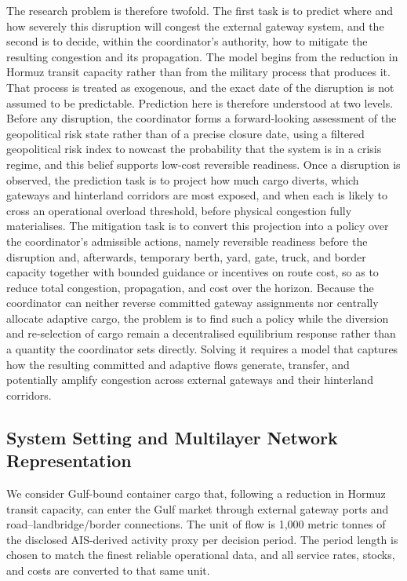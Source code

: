 \documentclass[a4paper,fleqn]{cas-sc}
\begin{document}
The research problem is therefore twofold. The first task is to predict where and how severely this disruption will congest the external gateway system, and the second is to decide, within the coordinator's authority, how to mitigate the resulting congestion and its propagation. The model begins from the reduction in Hormuz transit capacity rather than from the military process that produces it. That process is treated as exogenous, and the exact date of the disruption is not assumed to be predictable. Prediction here is therefore understood at two levels. Before any disruption, the coordinator forms a forward-looking assessment of the geopolitical risk state rather than of a precise closure date, using a filtered geopolitical risk index to nowcast the probability that the system is in a crisis regime, and this belief supports low-cost reversible readiness. Once a disruption is observed, the prediction task is to project how much cargo diverts, which gateways and hinterland corridors are most exposed, and when each is likely to cross an operational overload threshold, before physical congestion fully materialises. The mitigation task is to convert this projection into a policy over the coordinator's admissible actions, namely reversible readiness before the disruption and, afterwards, temporary berth, yard, gate, truck, and border capacity together with bounded guidance or incentives on route cost, so as to reduce total congestion, propagation, and cost over the horizon. Because the coordinator can neither reverse committed gateway assignments nor centrally allocate adaptive cargo, the problem is to find such a policy while the diversion and re-selection of cargo remain a decentralised equilibrium response rather than a quantity the coordinator sets directly. Solving it requires a model that captures how the resulting committed and adaptive flows generate, transfer, and potentially amplify congestion across external gateways and their hinterland corridors. 



\subsection{System Setting and Multilayer Network Representation}
\label{subsec:setting}

We consider Gulf-bound container cargo that, following a reduction in Hormuz
transit capacity, can enter the Gulf market through external gateway ports and
road--landbridge/border connections. The unit of flow is 1,000 metric tonnes of
the disclosed AIS-derived activity proxy per decision
period. The period length is chosen to match the finest reliable operational
data, and all service rates, stocks, and costs are converted to that same unit.
\end{document}
